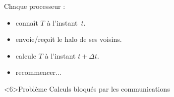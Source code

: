 \documentclass[xcolor={x11names,svgnames}]{beamer}
\begin{document}
\begin{frame}
\begin{minipage}[T]{7.2cm}
\begin{tikzpicture}[scale=0.4]
\end{tikzpicture}%
\end{minipage}\begin{minipage}[T]{4.5cm}
  Chaque processeur :
  \medskip
  \begin{itemize}
  \item<1-> connaît $T$ à l'instant~$t$.
  \item<2-> envoie/reçoit le \alert{halo} de ses voisins.
  \item<4-> calcule $T$ à l'instant $t + \Delta t$.
  \item<5-> recommencer...
  \end{itemize}

  \medskip

  \begin{alertblock}<6>{Problème}
    Calculs bloqués par les communications
  \end{alertblock}
\end{minipage}
\end{frame}


\end{document}
